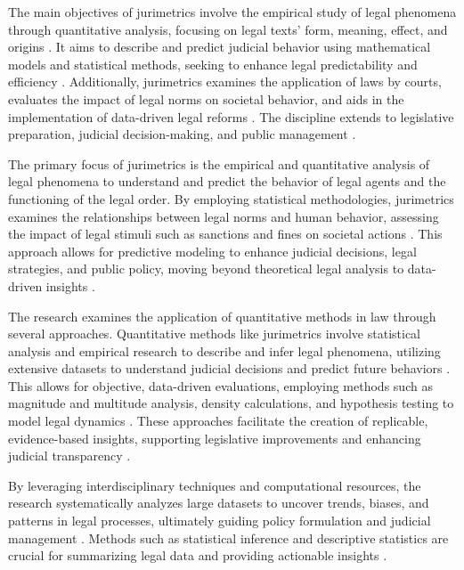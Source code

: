 The main objectives of jurimetrics involve the empirical study of legal phenomena through quantitative analysis, focusing on legal texts' form, meaning, effect, and origins \cite{de2010}. It aims to describe and predict judicial behavior using mathematical models and statistical methods, seeking to enhance legal predictability and efficiency \cite{loevinger1949, nunes2018}. Additionally, jurimetrics examines the application of laws by courts, evaluates the impact of legal norms on societal behavior, and aids in the implementation of data-driven legal reforms \cite{nunes2018, nunes2018, massuanganhe2016}. The discipline extends to legislative preparation, judicial decision-making, and public management \cite{zabala1809}.

The primary focus of jurimetrics is the empirical and quantitative analysis of legal phenomena to understand and predict the behavior of legal agents and the functioning of the legal order. By employing statistical methodologies, jurimetrics examines the relationships between legal norms and human behavior, assessing the impact of legal stimuli such as sanctions and fines on societal actions \cite{nunes2018, loevinger1949, nunes2018, luvizotto2020}. This approach allows for predictive modeling to enhance judicial decisions, legal strategies, and public policy, moving beyond theoretical legal analysis to data-driven insights \cite{nunes2018, nunes2018}.

The research examines the application of quantitative methods in law through several approaches. Quantitative methods like jurimetrics involve statistical analysis and empirical research to describe and infer legal phenomena, utilizing extensive datasets to understand judicial decisions and predict future behaviors \cite{colombo2017, luvizotto2020, nunes2018, massuanganhe2016}. This allows for objective, data-driven evaluations, employing methods such as magnitude and multitude analysis, density calculations, and hypothesis testing to model legal dynamics \cite{nunes2018, nunes2018}. These approaches facilitate the creation of replicable, evidence-based insights, supporting legislative improvements and enhancing judicial transparency \cite{massuanganhe2016, nunes2018, silva2023}.

By leveraging interdisciplinary techniques and computational resources, the research systematically analyzes large datasets to uncover trends, biases, and patterns in legal processes, ultimately guiding policy formulation and judicial management \cite{machado2017, de2010, ribeiro2021}. Methods such as statistical inference and descriptive statistics are crucial for summarizing legal data and providing actionable insights \cite{massuanganhe2016, zabala2019}.

